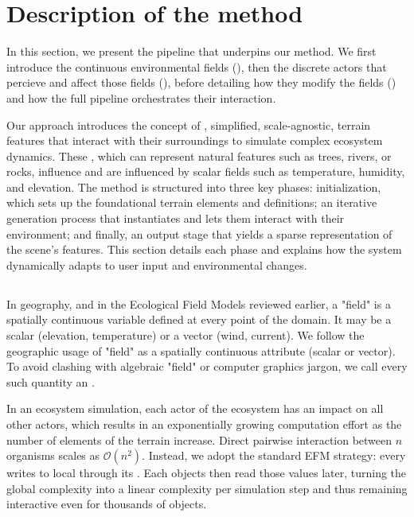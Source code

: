 \section{Description of the method}
\label{sec:env-obj-pipeline}

In this section, we present the pipeline that underpins our method. 
We first introduce the continuous environmental fields (), then the discrete actors that percieve and affect those fields (), before detailing how they modify the fields () and how the full pipeline orchestrates their interaction.

Our approach introduces the concept of , simplified, scale-agnostic, terrain features that interact with their surroundings to simulate complex ecosystem dynamics. These , which can represent natural features such as trees, rivers, or rocks, influence and are influenced by scalar fields such as temperature, humidity, and elevation. The method is structured into three key phases: initialization, which sets up the foundational terrain elements and  definitions; an iterative generation process that instantiates  and lets them interact with their environment; and finally, an output stage that yields a sparse representation of the scene's features. This section details each phase and explains how the system dynamically adapts to user input and environmental changes.

\subsection{}
\label{sec:env-obj-communication}

In geography, and in the Ecological Field Models reviewed earlier, a "field" is a spatially continuous variable defined at every point of the domain.  
It may be a scalar (elevation, temperature) or a vector (wind, current). We follow the geographic usage of "field" as a spatially continuous attribute (scalar or vector). To avoid clashing with algebraic "field" or computer graphics jargon, we call every such quantity an .

In an ecosystem simulation, each actor of the ecosystem has an impact on all other actors, which results in an exponentially growing computation effort as the number of elements of the terrain increase. Direct pairwise interaction between $n$ organisms scales as $\mathcal{O}(n^{2})$.  
Instead, we adopt the standard EFM strategy: every  writes to local  through its .  
Each objects then read those values later, turning the global complexity into a linear complexity per simulation step and thus remaining interactive even for thousands of objects.

